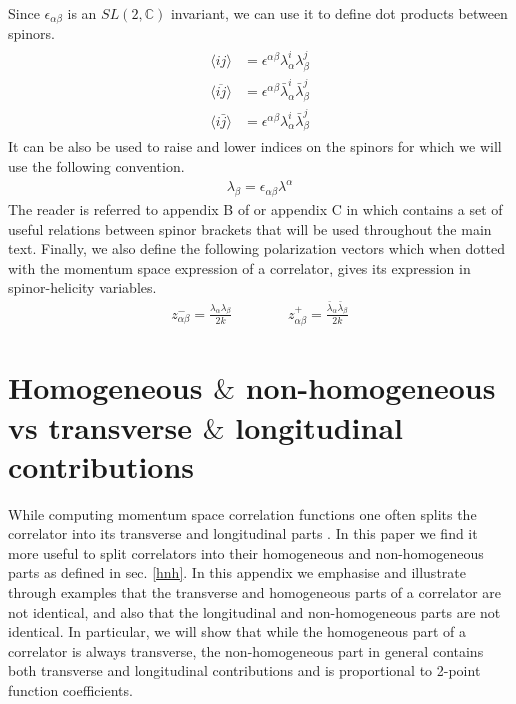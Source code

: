 \documentclass[a4paper,11pt]{article}
\begin{document}
%
Since $\epsilon_{\alpha \beta}$ is an $SL(2, \mathbb{C})$ invariant, we can use it to define dot products between spinors. 
\begin{align}
\begin{split}
\langle ij \rangle &= \epsilon^{\alpha\beta}\lambda^i_{\alpha}\lambda^j_{\beta}\\[5 pt]
\langle \overline{ij} \rangle&= \epsilon^{\alpha\beta}\bar{\lambda}^i_{\alpha}\bar{\lambda}^j_{\beta}\\[5 pt]
\langle i\bar{j} \rangle &= \epsilon^{\alpha\beta}\lambda^i_{\alpha}\bar{\lambda}^j_{\beta}
\end{split}
\end{align}
It can be also be used to raise and lower indices on the spinors for which we will use the following convention.
\begin{align}
\lambda_{\beta} = \epsilon_{\alpha\beta}\lambda^{\alpha}
\end{align}
The reader is referred to appendix B of \cite{Farrow:2018yni} or appendix C in \cite{Baumann:2020dch} which contains a set of useful relations between spinor brackets that will be used throughout the main text. Finally, we also define the following polarization vectors which when dotted with the momentum space expression of a correlator, gives its expression in spinor-helicity variables.
\begin{align}
z_{\alpha\beta}^-= \frac{\lambda_{\alpha}\lambda_{\beta}}{2k}\quad\quad\quad\quad z_{\alpha\beta}^+= \frac{\bar{\lambda}_{\alpha}\bar{\lambda}_{\beta}}{2k}
\end{align}



\section{Homogeneous $\&$ non-homogeneous vs transverse $\&$ longitudinal contributions}
\label{hnhvstl}
While computing momentum space correlation functions one often splits the correlator into its transverse and longitudinal parts \cite{Bzowski:2013sza}.
In this paper we find it more useful to split correlators into their homogeneous and non-homogeneous parts as defined in sec. \ref{hnh}. In this appendix we emphasise and illustrate through examples that the transverse and homogeneous parts of a correlator are not identical, and also that the longitudinal and non-homogeneous parts are not identical.  In particular, we will show that while the homogeneous part of a correlator is always transverse, the non-homogeneous part in general contains both transverse and longitudinal contributions and is proportional to 2-point function coefficients.
\end{document}
